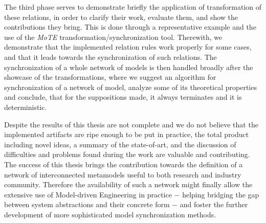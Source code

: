 \documentclass[tuberlin,cic,tc,english,noabntcite]{iiufrgs}
\begin{document}
The third phase serves to demonstrate briefly the application of transformation of these relations, in order to clarify their work, evaluate them, and show the contributions they bring. This is done through a representative example and the use of the \emph{MoTE} transformation/synchronization tool. Therewith, we demonstrate that the implemented relation rules work properly for some cases, and that it leads towards the synchronization of such relations. The synchronization of a whole network of models is then handled broadly after the showcase of the transformations, where we suggest an algorithm for synchronization of a network of model, analyze some of its theoretical properties and conclude, that for the suppositions made, it always terminates and it is deterministic.

Despite the results of this thesis are not complete and we do not believe that the implemented artifacts are ripe enough to be put in practice, the total product including novel ideas, a summary of the state-of-art, and the discussion of difficulties and problems found during the work are valuable and contributing. The success of this thesis brings the contribution towards the definition of a network of interconnected metamodels useful to both research and industry community. Therefore the availability of such a network might finally allow the extensive use of Model-driven Engineering in practice $-$ helping bridging the gap between system abstractions and their concrete form $-$ and foster the further development of more sophisticated model synchronization methods.




\end{document}
